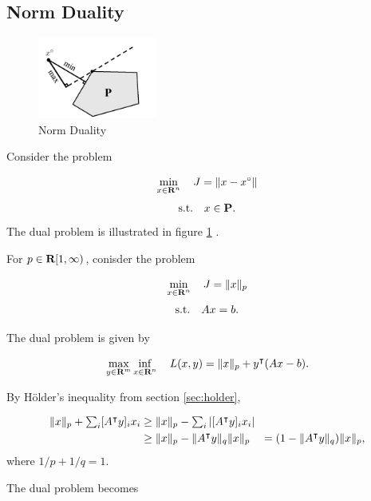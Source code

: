 \documentclass{article}
\begin{document}
\subsection{Norm Duality}

    \begin{figure}[h!]
        \centering
        \includegraphics[width=0.35\textwidth]{./figs/dual.png}
        \caption{Norm Duality}
        \label{fig:dual}
    \end{figure}

    Consider the problem

    \begin{align*}
        \min_{x\in\textbf{R}^n}\quad J = \|x-x^\circ\|
    \end{align*}
    \begin{align*}
        \text{s.t.} \quad x\in\textbf{P}.
    \end{align*}
    The dual problem is illustrated in figure \ref{fig:dual} \cite[p.~9]{luenberger}.

\clearpage

For $p\in\textbf{R}[1,\infty)$, conisder the problem

\begin{align*}
    \min_{x\in\textbf{R}^n}\quad J = \|x\|_p
\end{align*}
\begin{align*}
    \text{s.t.}\quad Ax = b.
\end{align*}

The dual problem is given by

\begin{align*}
    \max_{y\in\textbf{R}^m}\inf_{x\in\textbf{R}^n}\quad L(x,y) = \|x\|_p + y^\intercal (Ax-b).
\end{align*}

By Hölder's inequality from section \ref{sec:holder},

\begin{align*}
    \|x\|_p + \textstyle\sum_i[A^\intercal y]_i x_i &\geq \|x\|_p - \textstyle\sum_i|[A^\intercal y]_ix_i|\\
    &\geq \|x\|_p - \|A^\intercal y\|_q\|x\|_p\quad =(1-\|A^\intercal y\|_q)\|x\|_p,
\end{align*}
where $1/p+1/q=1$.

The dual problem becomes
\cite[p.~221]{bv_cvxbook}\cite[p.~107]{luenberger}\cite[p.~123]{luenberger}
\end{document}
